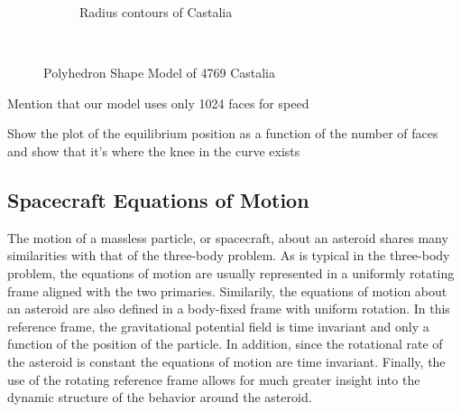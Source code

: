 \documentclass[]{aiaa-tc}%
\begin{document}
\begin{figure}
\begin{subfigure}[htbp]{0.45\textwidth}
        \caption{Radius contours of Castalia} \label{fig:radius_contour}
    \end{subfigure} ~ %
    \caption{Polyhedron Shape Model of 4769 Castalia}
    \label{fig:castalia}
\end{figure}


Mention that our model uses only 1024 faces for speed

Show the plot of the equilibrium position as a function of the number of faces and show that it's where the knee in the curve exists

\subsection{Spacecraft Equations of Motion}\label{sec:sc_eoms}

The motion of a massless particle, or spacecraft, about an asteroid shares many similarities with that of the three-body problem.
As is typical in the three-body problem, the equations of motion are usually represented in a uniformly rotating frame aligned with the two primaries.
Similarily, the equations of motion about an asteroid are also defined in a body-fixed frame with uniform rotation.
In this reference frame, the gravitational potential field is time invariant and only a function of the position of the particle.
In addition, since the rotational rate of the asteroid is constant the equations of motion are time invariant.
Finally, the use of the rotating reference frame allows for much greater insight into the dynamic structure of the behavior around the asteroid.
\end{document}
